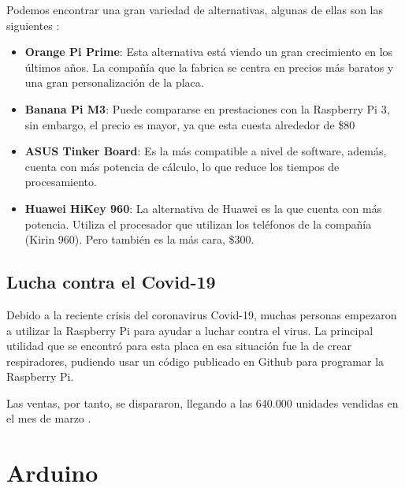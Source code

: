             Podemos encontrar una gran variedad de alternativas, algunas de ellas son las
            siguientes \cite{alternativas_raspberry_pi}:

            \begin{itemize}
                \item \textbf{Orange Pi Prime}: Esta alternativa está viendo un gran crecimiento en los últimos años. La
                compañía que la fabrica se centra en precios más baratos y una gran personalización de la placa.
                \item \textbf{Banana Pi M3}: Puede compararse en prestaciones con la Raspberry Pi 3, sin embargo, el
                precio es mayor, ya que esta cuesta alrededor de \$80
                \item \textbf{ ASUS Tinker Board}: Es la más compatible a nivel de software, además, cuenta con más
                potencia de cálculo, lo que reduce los tiempos de procesamiento.
                \item \textbf{Huawei HiKey 960}: La alternativa de Huawei es la que cuenta con más potencia. Utiliza el
                procesador que utilizan los teléfonos de la compañía (Kirin 960). Pero también es la más cara, \$300.
            \end{itemize}


        \subsection{Lucha contra el Covid-19} %
        \label{sub:LuchaContraElCovid-19}

            Debido a la reciente crisis del coronavirus Covid-19, muchas personas empezaron a utilizar la Raspberry Pi
            para ayudar a luchar contra el virus. La principal utilidad que se encontró para esta placa en esa situación
            fue la de crear respiradores, pudiendo usar un código publicado en Github \cite{github_respirador} para
            programar la Raspberry Pi.

            Las ventas, por tanto, se dispararon, llegando a las 640.000 unidades vendidas en el mes de
            marzo \cite{ventas_raspberry_pi_covid}.



    \section{Arduino} %
    \label{sec:Arduino}

